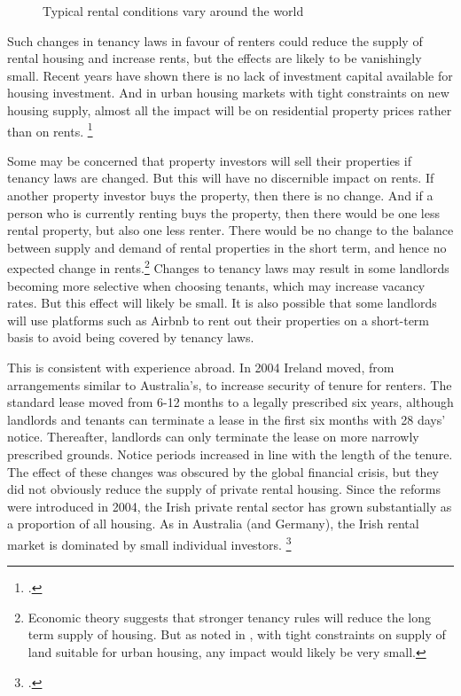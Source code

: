 \begin{figure}
\caption{Typical rental conditions vary around the world}\label{fig:rental-conditions-global}
\end{figure}



Such changes in tenancy laws in favour of renters could reduce the supply of rental housing and increase rents, but the effects are likely to be vanishingly small. Recent years have shown there is no lack of investment capital available for housing investment. And in urban housing markets with tight constraints on new housing supply, almost all the impact will be on residential property prices rather than on rents.%
	\footcite{DaleyWood2016-Negative-Gearing-CGT}

Some may be concerned that property investors will sell their properties if tenancy laws are changed.
But this will have no discernible impact on rents.
If another property investor buys the property, then there is no change.
And if a person who is currently renting buys the property, then there would be one less rental property, but also one less renter.
There would be no change to the balance between supply and demand of rental properties in the short term, and hence no expected change in rents.\footnote{Economic theory suggests that stronger tenancy rules will reduce the long term supply of housing. But as noted in \textcite[][31]{DaleyWood2016-Negative-Gearing-CGT}, with tight constraints on supply of land suitable for urban housing, any impact would likely be very small.}
Changes to tenancy laws may result in some landlords becoming more selective when choosing tenants, which may increase vacancy rates. But this effect will likely be small. It is also possible that some landlords will use platforms such as Airbnb to rent out their properties on a short-term basis to avoid being covered by tenancy laws.

This is consistent with experience abroad.
In 2004 Ireland moved, from arrangements similar to Australia's, to increase security of tenure for renters.
The standard lease moved from 6-12 months to a legally prescribed six years, although landlords and tenants can terminate a lease in the first six months with 28 days' notice.
Thereafter, landlords can only terminate the lease on more narrowly prescribed grounds.
Notice periods increased in line with the length of the tenure.
The effect of these changes was obscured by the global financial crisis, but they did not obviously reduce the supply of private rental housing. Since the reforms were introduced in 2004, the Irish private rental sector has grown substantially as a proportion of all housing.
As in Australia (and Germany), the Irish rental market is dominated by small individual investors.%
	\footcite[][21]{KellyHarrisonHunterEtAl2013}

